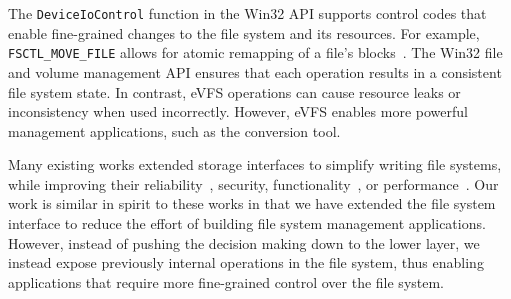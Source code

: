 The \texttt{DeviceIoControl} function in the Win32 API supports control codes that enable fine-grained changes to the file system and its resources. For example, \texttt{FSCTL\_MOVE\_FILE} allows for atomic remapping of a file's blocks~\cite{win32-defrag}. The Win32 file and volume management API ensures that each operation results in a consistent file system state. In contrast, eVFS operations can cause resource leaks or inconsistency when used incorrectly. However, eVFS enables more powerful management applications, such as the conversion tool. 



Many existing works extended storage interfaces to simplify writing file systems, while improving their reliability~\cite{Sivathanu06}, security, functionality~\cite{shin2016isotope}, or performance~\cite{zhang2012nameless,anand08rangewrites}. Our work is similar in spirit to these works in that we have extended the file system interface to reduce the effort of building file system management applications. However, instead of pushing the decision making down to the lower layer, we instead expose previously internal operations in the file system, thus enabling applications that require more fine-grained control over the file system.

